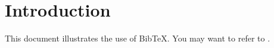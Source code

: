 \documentclass[10pt]{book}
\begin{document}
\thispagestyle{empty}

\maketitle
 

\frontmatter
\tableofcontents
\listoffigures
\listoftables
\mainmatter

 \hideControlVersion

\section{Introduction}
This document illustrates the use of BibTeX\@.  You may want to refer to \cite{ab94}.
 
   
    
%
\end{document}
